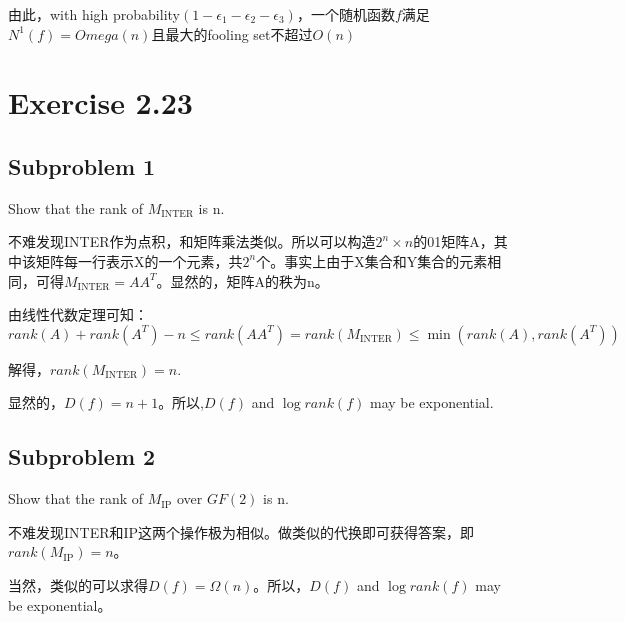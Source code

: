 \documentclass[13pt, fleqn, a4paper]{report}
\begin{document}
由此，with high probability$(1 - \epsilon_1 -\epsilon_2 - \epsilon_3)$，一个随机函数$f$满足$N^1(f) = Omega(n)$且最大的fooling set不超过$O(n)$

\section*{Exercise 2.23}
\subsection*{Subproblem 1}
Show that the rank of $M_{\mathrm{INTER}}$ is n.

不难发现INTER作为点积，和矩阵乘法类似。所以可以构造$2^n \times n$的01矩阵A，其中该矩阵每一行表示X的一个元素，共$2^n$个。事实上由于X集合和Y集合的元素相同，可得$M_{\mathrm{INTER}} = A A^T$。显然的，矩阵A的秩为n。

由线性代数定理可知：$$rank(A) + rank(A^T) - n \leq rank(AA^T)  = rank(M_{\mathrm{INTER}}) \leq \min(rank(A),rank(A^T))$$

解得，$ rank(M_{\mathrm{INTER}})  = n$.

显然的，$D(f) = n + 1$。所以,$D(f)$ and $\log{rank(f)}$ may be exponential.

\subsection*{Subproblem 2}
Show that the rank of $M_{\mathrm{IP}}$ over $GF(2)$ is n.

不难发现INTER和IP这两个操作极为相似。做类似的代换即可获得答案，即$ rank(M_{\mathrm{IP}})  = n$。

当然，类似的可以求得$D(f) = \Omega(n)$。所以，$D(f)$ and $\log{rank(f)}$ may be exponential。
\end{document}
